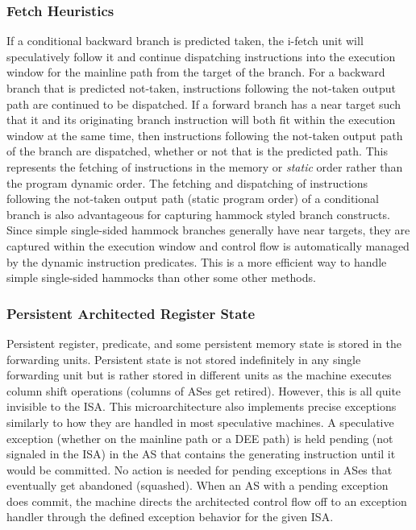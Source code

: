 \documentclass{book}
\begin{document}
\subsubsection{Fetch Heuristics}
%
If a conditional backward branch is predicted taken,
the i-fetch unit
will speculatively follow it and continue dispatching instructions
into the execution window for the mainline path from the target
of the branch.  
For a backward branch that
is predicted not-taken, 
instructions following the
not-taken output path are continued to be dispatched.
If a forward branch has a near target such
that it and its originating branch instruction will both
fit within the execution window at the same time, 
then instructions following the
not-taken output path of the branch are dispatched, 
whether or not that is the predicted path.
This represents the fetching of instructions in the 
memory or \textit{static} order rather than the program dynamic order.
The fetching and dispatching of instructions following the
not-taken output path (static program order) of a conditional
branch is also advantageous for 
capturing hammock styled branch constructs.  
Since simple single-sided hammock branches generally have near targets,
they are captured within the execution window and control flow
is automatically managed by the dynamic instruction predicates.
This is a more efficient way to handle simple single-sided
hammocks than other some other methods. ~\cite{Sank01b}
%
%
%
\subsubsection{Persistent Architected Register State}
%
Persistent register, predicate, and some persistent
memory state is stored in the forwarding units.
Persistent state is not stored indefinitely in any single forwarding
unit but is rather stored in different units as the machine
executes column shift operations (columns of ASes get retired).
However, this is all quite invisible to the ISA.
This microarchitecture also implements precise exceptions \cite{Smi88}
similarly to how they
are handled in most speculative machines.  
A speculative exception (whether on the mainline path or a DEE path)
is held pending (not signaled in the ISA)
in the AS that contains the generating
instruction until it would be committed.
No action is needed for pending exceptions in ASes that eventually
get abandoned (squashed).
When an AS with a pending exception does commit, the machine directs the
architected control flow off to an exception handler through
the defined exception behavior for the given ISA.
%
%
\end{document}
